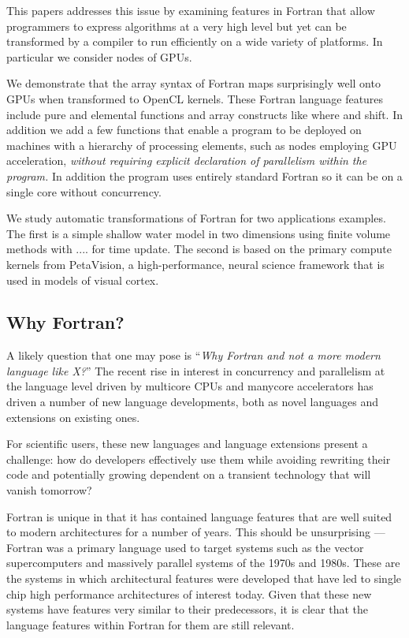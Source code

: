 \documentclass[10pt, conference, compsocconf]{IEEEtran}
\begin{document}
This papers addresses this issue by examining features in Fortran that
allow programmers to express algorithms at a very high level but yet
can be transformed by a compiler to run efficiently on a wide variety
of platforms.  In particular we consider nodes of GPUs.

We demonstrate that the array syntax of Fortran maps surprisingly well
onto GPUs when transformed to OpenCL kernels.  These Fortran language
features include pure and elemental functions and array constructs
like where and shift.  In addition we add a few functions that enable
a program to be deployed on machines with a hierarchy of processing
elements, such as nodes employing GPU acceleration, \emph{without
  requiring explicit declaration of parallelism within the program.}
In addition the program uses entirely standard Fortran so it can be on
a single core without concurrency.

We study automatic transformations of Fortran for two applications examples.
The first is a simple shallow water model in two dimensions using
finite volume methods with .... for time update.  The second is based
on the primary compute kernels from PetaVision, a high-performance, 
neural science framework that is used in models of visual cortex.

\subsection{Why Fortran?}

A likely question that one may pose is ``\emph{Why Fortran and not a
  more modern language like X?}''  The recent rise in interest in
concurrency and parallelism at the language level driven by multicore
CPUs and manycore accelerators has driven a number of new language
developments, both as novel languages and extensions on existing ones.

For scientific users, these new languages and language extensions
present a challenge: how do developers effectively use them while
avoiding rewriting their code and potentially growing dependent on a
transient technology that will vanish tomorrow?

Fortran is unique in that it has contained language features that are
well suited to modern architectures for a number of years.  This
should be unsurprising --- Fortran was a primary language used to
target systems such as the vector supercomputers and massively
parallel systems of the 1970s and 1980s.  These are the systems in
which architectural features were developed that have led to single
chip high performance architectures of interest today.  Given that
these new systems have features very similar to their predecessors, it
is clear that the language features within Fortran for them are still
relevant.
\end{document}

